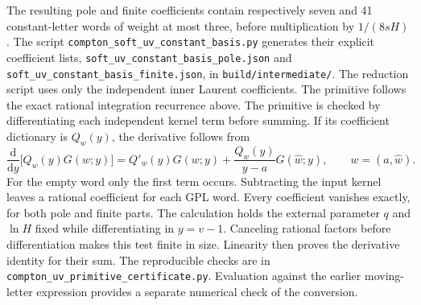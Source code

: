 The resulting pole and finite coefficients contain respectively seven and
41 constant-letter words of weight at most three, before multiplication
by $1/(8sH)$. The script \nolinkurl{compton_soft_uv_constant_basis.py}
generates their explicit coefficient lists,
\nolinkurl{soft_uv_constant_basis_pole.json} and
\nolinkurl{soft_uv_constant_basis_finite.json}, in
\nolinkurl{build/intermediate/}.
The reduction script uses only the independent inner Laurent coefficients.
The primitive follows the exact rational integration recurrence above.
The primitive is checked by differentiating each independent kernel
term before summing. If its coefficient dictionary is $Q_w(y)$,
the derivative follows from
\begin{equation}
 \frac{\mathrm d}{\mathrm dy}\bigl[Q_w(y)G(w;y)\bigr]
 =Q'_w(y)G(w;y)+\frac{Q_w(y)}{y-a}G(\widehat w;y),
 \qquad w=(a,\widehat w).
\end{equation}
For the empty word only the first term occurs. Subtracting the input
kernel leaves a rational coefficient for each GPL word.
Every coefficient vanishes exactly, for both pole and finite parts.
The calculation holds the external parameter $q$ and $\ln H$ fixed
while differentiating in $y=v-1$.
Canceling rational factors before differentiation makes this test finite
in size. Linearity then proves the derivative identity for their sum.
The reproducible checks are in
\texttt{compton\_uv\_primitive\_certificate.py}.
Evaluation against the earlier moving-letter expression provides
a separate numerical check of the conversion.


